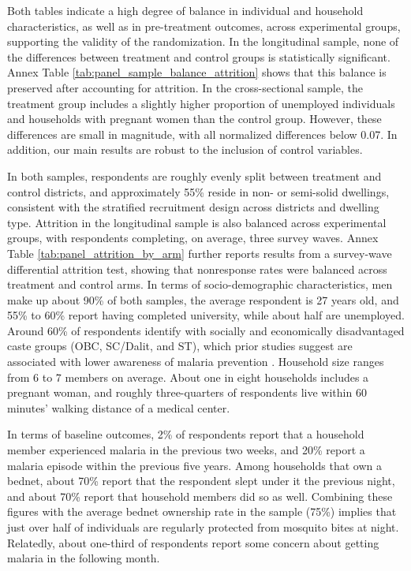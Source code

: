 Both tables indicate a high degree of balance in individual and household characteristics, as well as in pre-treatment outcomes, across experimental groups, supporting the validity of the randomization. In the longitudinal sample, none of the differences between treatment and control groups is statistically significant. Annex Table \ref{tab:panel_sample_balance_attrition} shows that this balance is preserved after accounting for attrition. In the cross-sectional sample, the treatment group includes a slightly higher proportion of unemployed individuals and households with pregnant women than the control group. However, these differences are small in magnitude, with all normalized differences below 0.07. In addition, our main results are robust to the inclusion of control variables.

In both samples, respondents are roughly evenly split between treatment and control districts, and approximately 55\% reside in non- or semi-solid dwellings, consistent with the stratified recruitment design across districts and dwelling type. Attrition in the longitudinal sample is also balanced across experimental groups, with respondents completing, on average, three survey waves. Annex Table \ref{tab:panel_attrition_by_arm} further reports results from a survey-wave differential attrition test, showing that nonresponse rates were balanced across treatment and control arms. In terms of socio-demographic characteristics, men make up about 90\% of both samples, the average respondent is 27 years old, and 55\% to 60\% report having completed university, while about half are unemployed. Around 60\% of respondents identify with socially and economically disadvantaged caste groups (OBC, SC/Dalit, and ST), which prior studies suggest are associated with lower awareness of malaria prevention \citep{malaria_SES_2020}. Household size ranges from 6 to 7 members on average. About one in eight households includes a pregnant woman, and roughly three-quarters of respondents live within 60 minutes’ walking distance of a medical center.

In terms of baseline outcomes, 2\% of respondents report that a household member experienced malaria in the previous two weeks, and 20\% report a malaria episode within the previous five years. Among households that own a bednet, about 70\% report that the respondent slept under it the previous night, and about 70\% report that household members did so as well. Combining these figures with the average bednet ownership rate in the sample (75\%) implies that just over half of individuals are regularly protected from mosquito bites at night. Relatedly, about one-third of respondents report some concern about getting malaria in the following month.

